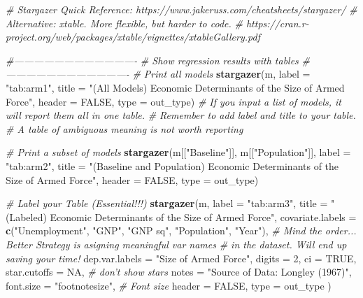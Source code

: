 \documentclass[11pt,]{article}
\newenvironment{Shaded}{\begin{snugshade}}{\end{snugshade}}
\newcommand{\KeywordTok}[1]{\textcolor[rgb]{0.13,0.29,0.53}{\textbf{#1}}}
\newcommand{\DataTypeTok}[1]{\textcolor[rgb]{0.13,0.29,0.53}{#1}}
\newcommand{\DecValTok}[1]{\textcolor[rgb]{0.00,0.00,0.81}{#1}}
\newcommand{\StringTok}[1]{\textcolor[rgb]{0.31,0.60,0.02}{#1}}
\newcommand{\CommentTok}[1]{\textcolor[rgb]{0.56,0.35,0.01}{\textit{#1}}}
\newcommand{\OtherTok}[1]{\textcolor[rgb]{0.56,0.35,0.01}{#1}}
\newcommand{\NormalTok}[1]{#1}
\begin{document}
\begin{Shaded}
\begin{Highlighting}[]
\CommentTok{# Stargazer Quick Reference: https://www.jakeruss.com/cheatsheets/stargazer/}
\CommentTok{# Alternative: xtable. More flexible, but harder to code.}
    \CommentTok{# https://cran.r-project.org/web/packages/xtable/vignettes/xtableGallery.pdf}

\CommentTok{#-------------------------------------}
\CommentTok{# Show regression results with tables}
\CommentTok{#-------------------------------------}
  \CommentTok{# Print all models}
    \KeywordTok{stargazer}\NormalTok{(m, }\DataTypeTok{label =} \StringTok{"tab:arm1"}\NormalTok{, }
              \DataTypeTok{title =} 
                \StringTok{"(All Models) Economic Determinants of the Size of Armed Force"}\NormalTok{,}
              \DataTypeTok{header =} \OtherTok{FALSE}\NormalTok{, }\DataTypeTok{type =}\NormalTok{ out_type)}
      \CommentTok{# If you input a list of models, it will report them all in one table.}
      \CommentTok{# Remember to add label and title to your table. }
      \CommentTok{# A table of ambiguous meaning is not worth reporting}

  \CommentTok{# Print a subset of models}
    \KeywordTok{stargazer}\NormalTok{(m[[}\StringTok{"Baseline"}\NormalTok{]], m[[}\StringTok{"Population"}\NormalTok{]], }\DataTypeTok{label =} \StringTok{"tab:arm2"}\NormalTok{, }
              \DataTypeTok{title =} 
                \StringTok{"(Baseline and Population) Economic Determinants of the Size of Armed Force"}\NormalTok{,}
              \DataTypeTok{header =} \OtherTok{FALSE}\NormalTok{, }\DataTypeTok{type =}\NormalTok{ out_type)}

  \CommentTok{# Label your Table (Essential!!!)}
    \KeywordTok{stargazer}\NormalTok{(m, }\DataTypeTok{label =} \StringTok{"tab:arm3"}\NormalTok{,}
              \DataTypeTok{title =} \StringTok{"(Labeled) Economic Determinants of the Size of Armed Force"}\NormalTok{,}
              \DataTypeTok{covariate.labels =} \KeywordTok{c}\NormalTok{(}\StringTok{"Unemployment"}\NormalTok{, }\StringTok{"GNP"}\NormalTok{,}
                                   \StringTok{"GNP sq"}\NormalTok{, }\StringTok{"Population"}\NormalTok{, }\StringTok{"Year"}\NormalTok{),}
                \CommentTok{# Mind the order... Better Strategy is asigning meaningful var names}
                \CommentTok{# in the dataset. Will end up saving your time!}
              \DataTypeTok{dep.var.labels =} \StringTok{"Size of Armed Force"}\NormalTok{,}
              \DataTypeTok{digits =} \DecValTok{2}\NormalTok{,}
              \DataTypeTok{ci =} \OtherTok{TRUE}\NormalTok{,}
              \DataTypeTok{star.cutoffs =} \OtherTok{NA}\NormalTok{, }\CommentTok{# don't show stars}
              \DataTypeTok{notes =} \StringTok{"Source of Data: Longley (1967)"}\NormalTok{,}
              \DataTypeTok{font.size =} \StringTok{"footnotesize"}\NormalTok{, }\CommentTok{# Font size}
              \DataTypeTok{header =} \OtherTok{FALSE}\NormalTok{, }\DataTypeTok{type =}\NormalTok{ out_type}
\NormalTok{              )}
\end{Highlighting}
\end{Shaded}

\normalsize
\end{document}
